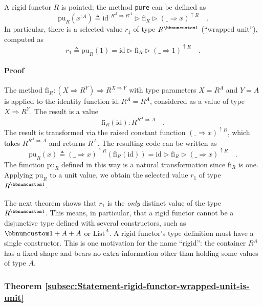 A rigid functor $R$ is pointed; the method \lstinline!pure!
can be defined as
\[
\text{pu}_{R}(x^{:A})\triangleq\text{id}^{:R^{A}\Rightarrow R^{A}}\triangleright\text{fi}_{R}\triangleright(\_\Rightarrow x)^{\uparrow R}\quad.
\]
In particular, there is a selected value $r_{1}$ of type $R^{\bbnum 1}$
(``wrapped unit''), computed as 
\begin{equation}
r_{1}\triangleq\text{pu}_{R}(1)=\text{id}\triangleright\text{fi}_{R}\triangleright(\_\Rightarrow1)^{\uparrow R}\quad.\label{eq:rigid-functor-def-of-wrapped-unit}
\end{equation}


\paragraph{Proof}

The method $\text{fi}_{R}:(X\Rightarrow R^{Y})\Rightarrow R^{X\Rightarrow Y}$
with type parameters $X=R^{A}$ and $Y=A$ is applied to the identity
function $\text{id}:R^{A}=R^{A}$, considered as a value of type $X\Rightarrow R^{Y}$.
The result is a value
\[
\text{fi}_{R}(\text{id}):R^{R^{A}\Rightarrow A}\quad.
\]
The result is transformed via the raised constant function $\left(\_\Rightarrow x\right)^{\uparrow R}$,
which takes $R^{R^{A}\Rightarrow A}$ and returns $R^{A}$. The resulting
code can be written as
\[
\text{pu}_{R}(x)\triangleq(\_\Rightarrow x)^{\uparrow R}(\text{fi}_{R}(\text{id}))=\text{id}\triangleright\text{fi}_{R}\triangleright(\_\Rightarrow x)^{\uparrow R}\quad.
\]
The function $\text{pu}_{R}$ defined in this way is a natural transformation
since $\text{fi}_{R}$ is one. Applying $\text{pu}_{R}$ to a unit
value, we obtain the selected value $r_{1}$ of type $R^{\bbnum 1}$.

The next theorem shows that $r_{1}$ is the \emph{only} distinct value
of the type $R^{\bbnum 1}$. This means, in particular, that a rigid
functor cannot be a disjunctive type defined with several constructors,
such as $\bbnum 1+A+A$ or $\text{List}^{A}$. A rigid functor's type
definition must have a single constructor. This is one motivation
for the name ``rigid'': the container $R^{A}$ has a fixed shape
and bears no extra information other than holding some values of type
$A$. 

\subsubsection{Theorem \label{subsec:Statement-rigid-functor-wrapped-unit-is-unit}\ref{subsec:Statement-rigid-functor-wrapped-unit-is-unit}}

